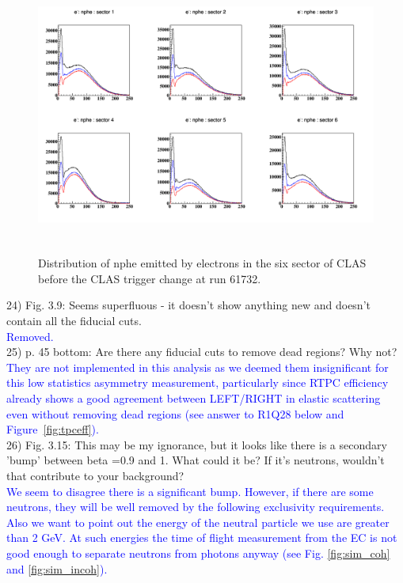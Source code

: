 \begin{figure}[tbp]
\centering
\includegraphics[height=9.2cm]{fig/nphe_1_sectors.png}
\caption{Distribution of nphe emitted by electrons in the six sector of CLAS 
before the CLAS trigger change at run 61732.}
\label{fig:nphe_1}
\end{figure}


24) Fig. 3.9: Seems superfluous - it doesn't show anything new and doesn't 
contain all the fiducial cuts.\\
 \textcolor{blue}{Removed.}\\


25) p. 45 bottom: Are there any fiducial cuts to remove dead regions? Why 
not?\\
\textcolor{blue}{They are not implemented in this analysis as we deemed them
insignificant for this low statistics asymmetry measurement, particularly since
RTPC efficiency already shows a good agreement between LEFT/RIGHT in elastic scattering even
without removing dead regions (see answer to R1Q28 below and Figure~\ref{fig:tpceff}).}\\


26) Fig. 3.15: This may be my ignorance, but it looks like there is a 
secondary 'bump' between beta =0.9 and 1. What could it be? If it's neutrons, 
wouldn't that contribute to your background?\\
\textcolor{blue}{We seem to disagree there is a significant bump. However, if 
   there are some neutrons, they will be well removed by the following 
   exclusivity requirements. Also we want to point out the energy of the 
   neutral particle we use are greater than 2 GeV.  At such energies the time 
   of flight measurement from the EC is not good enough to separate neutrons 
   from photons anyway (see Fig.  \ref{fig:sim_coh} and 
\ref{fig:sim_incoh}).}\\


